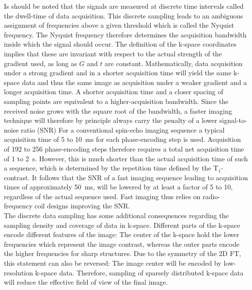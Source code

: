 Is should be noted that the signals are measured 
at discrete time intervals called the dwell-time of data acquisition. This discrete sampling leads to an ambiguous assignment of frequencies above a given threshold which is called the Nyquist frequency. The Nyquist frequency therefore determines the acquisition bandwidth inside which the signal should occur. The definition of the k-space coordinates implies that these are invariant with respect to the actual strength of the gradient used, as long as $G$ and $t$ are constant. Mathematically, data acquisition under a strong gradient and in a shorter acquisition time will yield the same k-space data and thus the same image as acquisition under a weaker gradient and a longer acquisition time. A shorter acquisition time and a closer spacing of sampling points are equivalent to a higher-acquisition bandwidth. Since the received noise grows with the square root of the bandwidth, a faster imaging technique will therefore by principle always carry the penalty of a lower signal-to-noise ratio (SNR)
For a conventional spin-echo imaging sequence
a typical acquisition time of 5 to 10~ms for each phase-encoding step is used. Acquisition of 
192 to 256 phase-encoding steps therefore requires a total net acquisition time of 1 to 2~s. However, this is much shorter than the 
actual
acquisition time of such a sequence, which is determined by the repetition time defined by the $\text{T}_1$-contrast. 
It 
follows that the SNR of a fast imaging sequence leading to acquisition times of approximately 50~ms, will be lowered by at least a factor of 5 to 10, regardless of the actual sequence used. 
Fast imaging thus relies on radio-frequency coil designs improving the SNR.\\
The discrete data sampling has some additional consequences regarding the sampling density and coverage of data in k-space. Different parts of the k-space encode different features of the image: The center of the k-space hold the lower frequencies which represent the image contrast, whereas the outer parts encode the higher frequencies for sharp structures. Due to the symmetry of the 2D FT, this statement can also be reversed: The image center will be encoded by low-resolution k-space data. Therefore, sampling of sparsely distributed k-space data will reduce the effective field of view of the final image. \\
